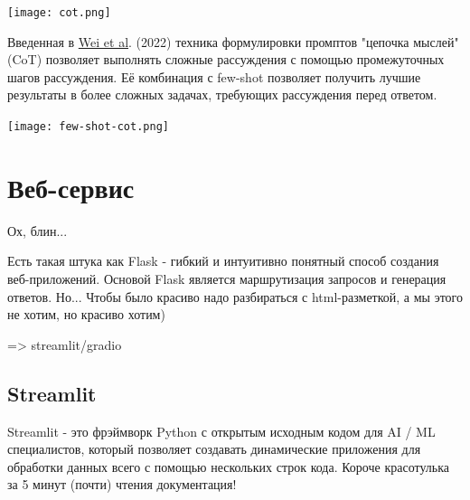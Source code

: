 \documentclass{article}
\begin{document}
\texttt{[image: cot.png]}

Введенная в \href{https://arxiv.org/abs/2201.11903}{Wei et al}. (2022) техника формулировки промптов "цепочка мыслей" (CoT) позволяет выполнять сложные рассуждения с помощью промежуточных шагов рассуждения. Её комбинация с few-shot позволяет получить лучшие результаты в более сложных задачах, требующих рассуждения перед ответом.

\texttt{[image: few-shot-cot.png]}



\newpage







\section{Веб-сервис}

Ох, блин...

Есть такая штука как Flask -  гибкий и интуитивно понятный способ создания веб-приложений. Основой Flask является маршрутизация запросов и генерация ответов. Но... Чтобы было красиво надо разбираться с html-разметкой, а мы этого не хотим, но красиво хотим)

=> streamlit/gradio

\subsection{Streamlit}

Streamlit - это фрэймворк Python с открытым исходным кодом для AI / ML специалистов, который позволяет создавать динамические приложения для обработки данных всего с помощью нескольких строк кода. Короче красотулька за 5 минут (почти) чтения документация!
\end{document}
